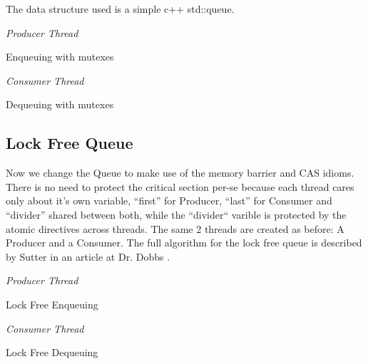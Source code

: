 \documentclass{article}
\begin{document}
The data structure used is a simple c++ std::queue.

\begin{algorithm}[htp]
\BlankLine
\emph{Producer Thread}\;
\caption{Enqueuing with mutexes}
\begin{procedure}[H]
\DontPrintSemicolon
{}
\label{alg:enq1}
\end{procedure}

\BlankLine
\emph{Consumer Thread}\;
\caption{Dequeuing with mutexes}
\begin{procedure}[H]
\DontPrintSemicolon
{}
\label{alg:deq1}
\end{procedure}

\end{algorithm}

\subsection{Lock Free Queue}

Now we change the Queue to make use of the memory barrier and CAS idioms. There is no need to protect the critical section per-se because each thread cares only about it's own variable, ``first'' for Producer, ``last'' for Consumer and ``divider'' shared between both, while the ``divider`` varible is protected by the atomic directives across threads. The same 2 threads are created as before: A Producer and a Consumer. The full algorithm for the lock free queue is described by Sutter in an article at Dr. Dobbs \cite{Sutter08}.

\begin{algorithm}[h]
\BlankLine
\emph{Producer Thread}\;
\caption{Lock Free Enqueuing}
\begin{procedure}[H]
\DontPrintSemicolon
{}
\label{alg:enq2}
\end{procedure}

\BlankLine
\emph{Consumer Thread}\;
\caption{Lock Free Dequeuing}
\begin{procedure}[H]
\DontPrintSemicolon
{}
\label{alg:deq2}
\end{procedure}

\end{algorithm}
\end{document}
